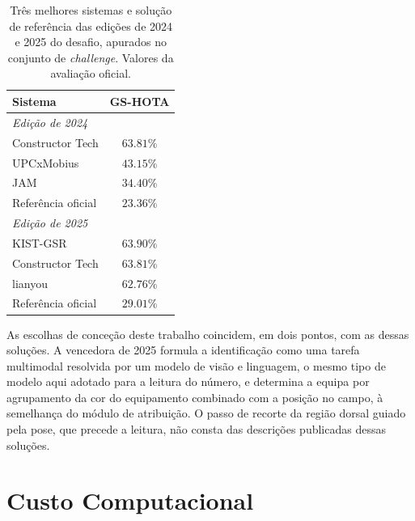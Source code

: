 \begin{table}[htbp]
    \centering
    \caption{Três melhores sistemas e solução de referência das edições de 2024 e 2025 do desafio,
    apurados no conjunto de \emph{challenge}. Valores da avaliação oficial.}
    \label{tab:leaderboard}
    \begin{tabular}{|l|c|}
        \hline
        \textbf{Sistema} & \textbf{GS-HOTA} \\
        \hline
        \multicolumn{2}{|l|}{\textit{Edição de 2024}} \\
        \hline
        Constructor Tech  & $63.81\%$ \\
        \hline
        UPCxMobius        & $43.15\%$ \\
        \hline
        JAM               & $34.40\%$ \\
        \hline
        Referência oficial & $23.36\%$ \\
        \hline
        \multicolumn{2}{|l|}{\textit{Edição de 2025}} \\
        \hline
        KIST-GSR          & $63.90\%$ \\
        \hline
        Constructor Tech  & $63.81\%$ \\
        \hline
        lianyou           & $62.76\%$ \\
        \hline
        Referência oficial & $29.01\%$ \\
        \hline
    \end{tabular}
\end{table}

As escolhas de conceção deste trabalho coincidem, em dois pontos, com as dessas soluções. A
vencedora de 2025 formula a identificação como uma tarefa multimodal resolvida por um modelo de
visão e linguagem, o mesmo tipo de modelo aqui adotado para a leitura do número, e determina a
equipa por agrupamento da cor do equipamento combinado com a posição no campo, à semelhança do
módulo de atribuição. O passo de recorte da região dorsal guiado pela pose, que precede a leitura,
não consta das descrições publicadas dessas soluções.

\section{Custo Computacional}\label{sec:res_tempos}

